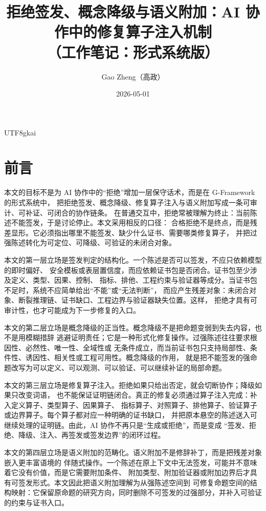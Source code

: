 \documentclass[12pt]{article}
\newcommand{\GFramework}{\textsf{G-Framework}}
\begin{document}
\begin{CJK*}{UTF8}{gkai}

\title{拒绝签发、概念降级与语义附加：AI 协作中的修复算子注入机制\\（工作笔记：形式系统版）}
\author{Gao Zheng（高政）}
\date{2026-05-01}
\maketitle

\section*{前言}

本文的目标不是为 AI 协作中的“拒绝”增加一层保守话术，而是在 \GFramework{} 的形式系统中，
把拒绝签发、概念降级、修复算子注入与语义附加写成一条可审计、可补证、可闭合的协作链条。
在普通交互中，拒绝常被理解为终止：当前陈述不能签发，于是讨论停止。本文采用相反的口径：
合格拒绝不是终点，而是残差显形。它必须指出哪里不能签发、缺少什么证书、需要哪类修复算子，
并把过强陈述转化为可定位、可降级、可验证的未闭合对象。

本文的第一层立场是签发判定的结构化。一个陈述是否可以签发，不应只依赖模型的即时偏好、
安全模板或表层置信度，而应依赖证书包是否闭合。证书包至少涉及定义、类型、因果、控制、
指标、排他、工程约束与验证器等成分。当证书包不足时，系统不应简单给出“不能”或“无法判断”，
而应产生残差对象：未闭合对象、断裂推理链、证书缺口、工程边界与验证器缺失位置。这样，
拒绝才具有可审计性，也才可能成为下一步修复的入口。

本文的第二层立场是概念降级的正当性。概念降级不是把命题变弱到失去内容，也不是用模糊措辞
逃避证明责任；它是一种形式化修复操作。过强陈述往往要求根因性、必然性、唯一性、全域性或
无条件成立，而当前证书包只支持局部性、条件性、诱因性、相关性或工程可用性。概念降级的作用，
就是把不能签发的强命题改写为可以定义、可以观测、可以验证、可以继续补证的局部命题。

本文的第三层立场是修复算子注入。拒绝如果只给出否定，就会切断协作；降级如果只改变词语，
也不能保证证明链闭合。真正的修复必须通过算子注入完成：补入定义算子、类型算子、因果算子、
指标算子、对照算子、排他算子、验证算子或边界算子。每个算子都对应一种明确的证书缺口，
并把原本悬空的陈述送入可继续处理的证明链。由此，AI 协作不再只是“生成或拒绝”，而是变成
“签发、拒绝、降级、注入、再签发或签发边界”的闭环过程。

本文的第四层立场是语义附加的范畴化。语义附加不是修辞补丁，而是把残差对象嵌入更丰富语境的
伴随式操作。一个陈述在原上下文中无法签发，可能并不意味着它没有价值，而是它需要附加条件、
附加类型、附加验证器或附加边界后才具有可签发形式。本文因此把语义附加理解为从强陈述空间到
可修复命题空间的结构映射：它保留原命题的研究方向，同时删除不可签发的过强部分，并补入可验证
的约束与证书入口。


\end{CJK*}
\end{document}
